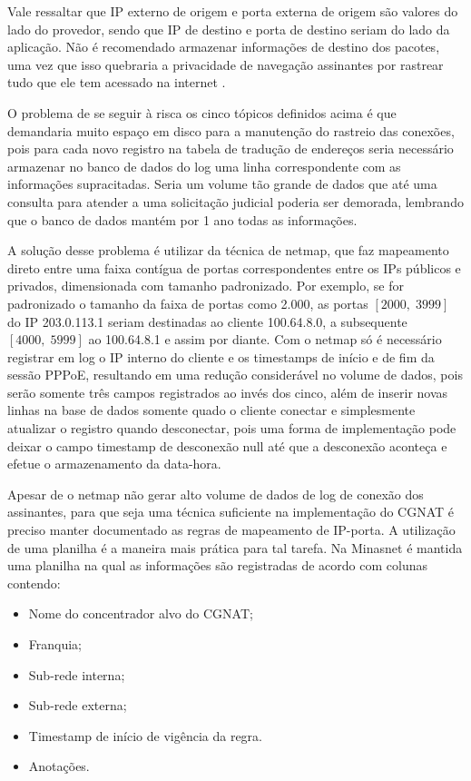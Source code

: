    Vale ressaltar que IP externo de origem e porta externa de origem são valores do lado do provedor, sendo que IP de destino e porta de destino seriam do lado da aplicação. Não é recomendado armazenar informações de destino dos pacotes, uma vez que isso quebraria a privacidade de navegação assinantes por rastrear tudo que ele tem acessado na internet \cite{rfc6888}.

   O problema de se seguir à risca os cinco tópicos definidos acima é que demandaria muito espaço em disco para a manutenção do rastreio das conexões, pois para cada novo registro na tabela de tradução de endereços seria necessário armazenar no banco de dados do log uma linha correspondente com as informações supracitadas. Seria um volume tão grande de dados que até uma consulta para atender a uma solicitação judicial poderia ser demorada, lembrando que o banco de dados mantém por 1 ano todas as informações.

   A solução desse problema é utilizar da técnica de netmap, que faz mapeamento direto entre uma faixa contígua de portas correspondentes entre os IPs públicos e privados, dimensionada com tamanho padronizado. Por exemplo, se for padronizado o tamanho da faixa de portas como 2.000, as portas $ [2000, \; 3999] $ do IP 203.0.113.1 seriam destinadas ao cliente 100.64.8.0, a subsequente $ [4000, \; 5999] $ ao 100.64.8.1 e assim por diante. Com o netmap só é necessário registrar em log o IP interno do cliente e os timestamps de início e de fim da sessão PPPoE, resultando em uma redução considerável no volume de dados, pois serão somente três campos registrados ao invés dos cinco, além de inserir novas linhas na base de dados somente quado o cliente conectar e simplesmente atualizar o registro quando desconectar, pois uma forma de implementação pode deixar o campo timestamp de desconexão null até que a desconexão aconteça e efetue o armazenamento da data-hora.

   Apesar de o netmap não gerar alto volume de dados de log de conexão dos assinantes, para que seja uma técnica suficiente na implementação do CGNAT é preciso manter documentado as regras de mapeamento de IP-porta. A utilização de uma planilha é a maneira mais prática para tal tarefa. Na Minasnet é mantida uma planilha na qual as informações são registradas de acordo com colunas contendo:

   \begin{itemize}
       \item Nome do concentrador alvo do CGNAT;
       \item Franquia;
       \item Sub-rede interna;
       \item Sub-rede externa;
       \item Timestamp de início de vigência da regra.
       \item Anotações.
   \end{itemize}
   
